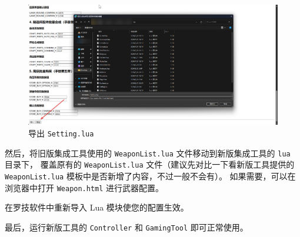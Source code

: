 \begin{figure}[H]
    \Centering
    \includegraphics[width=\textwidth]{docs/assets/update/override_setting}
    \caption{导出 \lstinline{Setting.lua}}
\end{figure}

然后，将旧版集成工具使用的 \lstinline{WeaponList.lua} 文件移动到新版集成工具的 \lstinline{lua} 目录下，
覆盖原有的 \lstinline{WeaponList.lua} 文件（建议先对比一下看新版工具提供的 \lstinline{WeaponList.lua} 模板中是否新增了内容，不过一般不会有）。
如果需要，可以在浏览器中打开 \lstinline{Weapon.html} 进行武器配置。

在罗技软件中重新导入 Lua 模块使您的配置生效。

最后，运行新版工具的 \lstinline{Controller} 和 \lstinline{GamingTool} 即可正常使用。